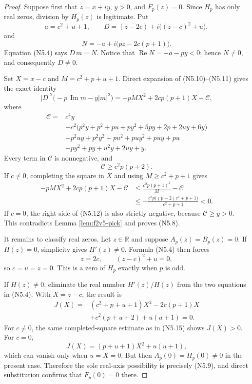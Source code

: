 \documentclass[11pt]{article}
\theoremstyle{definition}
\theoremstyle{remark}
\newcommand{\abs}[1]{\left\lvert #1\right\rvert}
\begin{document}
\begin{proof}
Suppose first that \(z=x+iy\), \(y>0\), and \(F_p(z)=0\).  Since \(H_p\)
has only real zeros, division by \(H_p(z)\) is legitimate.  Put
\[
 a=c^2+u+1,\qquad
 D=(z-2c)+i\bigl((z-c)^2+u\bigr),
 \tag{N5.10}
\]
and
\[
 N=-a+i\bigl(pz-2c(p+1)\bigr).
 \tag{N5.11}
\]
Equation \textup{(N5.4)} says \(D\,m=N\).  Notice that
\(\operatorname{Re}N=-a-py<0\); hence \(N\ne0\), and consequently
\(D\ne0\).

Set \(X=x-c\) and \(M=c^2+p+u+1\).  Direct expansion of
\textup{(N5.10)}--\textup{(N5.11)} gives the exact identity
\[
 \abs{D}^2\bigl(-p\,\operatorname{Im}m-y\abs{m}^2\bigr)
 =-pMX^2+2cp(p+1)X-\mathcal C,
 \tag{N5.12}
\]
where
\[
\begin{aligned}
\mathcal C={}&c^4y\\
&+c^2\bigl(
p^2y+p^2+pu+py^2+5py+2p+2uy+6y
\bigr)\\
&+p^2uy+p^2y^2+pu^2+puy^2+puy+pu\\
&+py^2+py+u^2y+2uy+y.
\end{aligned}
\tag{N5.13}
\]
Every term in \(\mathcal C\) is nonnegative, and
\[
 \mathcal C\ge c^2p(p+2).
 \tag{N5.14}
\]
If \(c\ne0\), completing the square in \(X\) and using
\(M\ge c^2+p+1\) gives
\[
\begin{aligned}
 -pMX^2+2cp(p+1)X-\mathcal C
 &\le \frac{c^2p(p+1)^2}{M}-\mathcal C\\
 &\le
 -\frac{c^2p\bigl((p+2)c^2+p+1\bigr)}
 {c^2+p+1}<0.
\end{aligned}
\tag{N5.15}
\]
If \(c=0\), the right side of \textup{(N5.12)} is also strictly negative,
because \(\mathcal C\ge y>0\).  This contradicts Lemma
\ref{lem:f2v5-pick} and proves \textup{(N5.8)}.

It remains to classify real zeros.  Let \(z\in\mathbb R\) and suppose
\(A_p(z)=B_p(z)=0\).  If \(H(z)=0\), simplicity gives \(H'(z)\ne0\).
Formula \textup{(N5.4)} then forces
\[
 z=2c,\qquad (z-c)^2+u=0,
 \tag{N5.16}
\]
so \(c=u=z=0\).  This is a zero of \(H_p\) exactly when \(p\) is odd.

If \(H(z)\ne0\), eliminate the real number \(H'(z)/H(z)\) from the two
equations in \textup{(N5.4)}.  With \(X=z-c\), the result is
\[
\begin{aligned}
 J(X)={}&
 (c^2+p+u+1)X^2-2c(p+1)X\\
 &+c^2(p+u+2)+u(u+1)=0.
\end{aligned}
\tag{N5.17}
\]
For \(c\ne0\), the same completed-square estimate as in
\textup{(N5.15)} shows \(J(X)>0\).  For \(c=0\),
\[
 J(X)=(p+u+1)X^2+u(u+1),
 \tag{N5.18}
\]
which can vanish only when \(u=X=0\).  But then
\(A_p(0)=H_p(0)\ne0\) in the present case.  Therefore the sole real-axis
possibility is precisely \textup{(N5.9)}, and direct substitution confirms
that \(F_p(0)=0\) there.
\end{proof}
\end{document}
